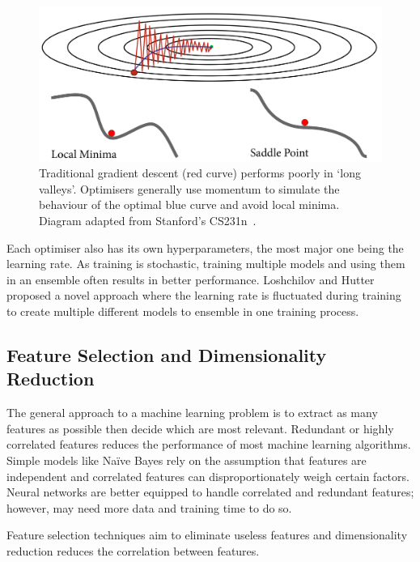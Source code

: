 \documentclass[12pt, twoside]{book}
\begin{document}
\newpage
\begin{figure}[!htb]
	\centering\includegraphics[width=0.82\linewidth]{gradescent.png}
	\caption{Traditional gradient descent (red curve) performs poorly in `long valleys'. Optimisers generally use momentum to simulate the behaviour of the optimal blue curve and avoid local minima. Diagram adapted from Stanford's CS231n~\cite{cs231n}.}
	\label{graddescent}
\end{figure}

Each optimiser also has its own hyperparameters, the most major one being the learning rate. As training is stochastic, training multiple models and using them in an ensemble often results in better performance. Loshchilov and Hutter~\cite{sgdrestarts} proposed a novel approach where the learning rate is fluctuated during training to create multiple different models to ensemble in one training process. 

\vspace{1em}

\subsection{Feature Selection and Dimensionality Reduction}
\label{fseldimred}
The general approach to a machine learning problem is to extract as many features as possible then decide which are most relevant. Redundant or highly correlated features reduces the performance of most machine learning algorithms. Simple models like Na\"{i}ve Bayes rely on the assumption that features are independent and correlated features can disproportionately weigh certain factors. Neural networks are better equipped to handle correlated and redundant features; however, may need more data and training time to do so. 



\begin{highlight}
	Feature selection techniques aim to eliminate useless features and dimensionality reduction reduces the correlation between features.
\end{highlight} 
\end{document}

